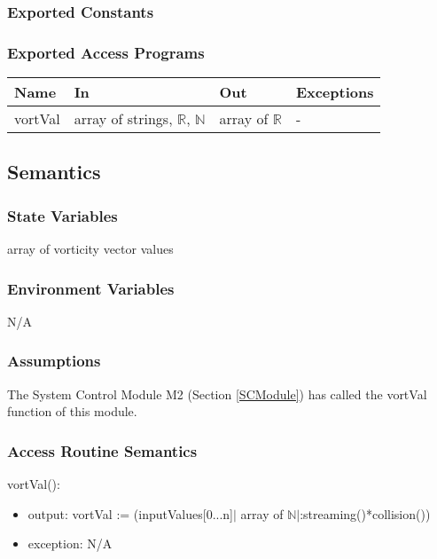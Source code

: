 \documentclass[12pt, titlepage]{article}
\begin{document}
\subsubsection{Exported Constants}

\subsubsection{Exported Access Programs}

\begin{center}
	\begin{tabular}{p{2cm} p{4cm} p{4cm} p{2cm}}
		\hline
		\textbf{Name} & \textbf{In} & \textbf{Out} & \textbf{Exceptions} \\
		\hline
		vortVal & array of strings, $\mathbb{R}$, $\mathbb{N}$ & array of $\mathbb{R}$ & - \\
		\hline
	\end{tabular}
\end{center}

\subsection{Semantics}

\subsubsection{State Variables}

array of vorticity vector values

\subsubsection{Environment Variables}
N/A

\subsubsection{Assumptions}

The System Control Module M2 (Section \ref{SCModule}) has called the vortVal function of this module.

\subsubsection{Access Routine Semantics}

\noindent vortVal():
\begin{itemize}
	\item output: vortVal := (inputValues[0...n]$|$ array of $\mathbb{N}$$|$:streaming()*collision())
	\item exception: N/A
\end{itemize}
\end{document}
